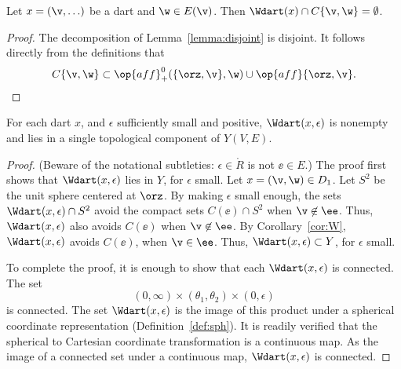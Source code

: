 \begin{corollary}\label{cor:W}
Let $x = (\v,\ldots)$ be a dart and $\w\in E(\v)$.
Then $\Wdart(x)\cap C\{\v,\w\}=\emptyset$.
\end{corollary}

\begin{proof} The decomposition of Lemma~\ref{lemma:disjoint} is
disjoint.  It follows directly from the definitions that
\begin{displaymath}C\{\v,\w\}\subset \op{aff}_+^0(\{\orz,\v\},\w) \cup 
\op{aff}\{\orz,\v\}.\end{displaymath}
\end{proof}

\begin{lemma}[] 
For each dart $x$, and $\epsilon$ sufficiently small and positive,
$\Wdart(x,\epsilon)$ is nonempty and lies in a single 
topological component of $Y(V,E)$.
\end{lemma}
%
%

\begin{proof} (Beware of the notational subtleties:
$\epsilon\in\ring{R}$ is not $\ee\in E$.)  The proof first shows
that $\Wdart(x,\epsilon)$ lies in $Y$, for $\epsilon$ small.  Let
$x=(\v,\w)\in D_1$.  Let $S^2$ be the unit sphere centered at
$\orz$.  By making $\epsilon$ small enough, the sets
$\Wdart(x,\epsilon)\cap S^2$ avoid the compact sets $C(\ee)\cap S^2$
when $\v\not\in \ee$.  Thus, $\Wdart(x,\epsilon)$ also avoids
$C(\ee)$ when $\v\not\in \ee$.  By Corollary~\ref{cor:W},
$\Wdart(x,\epsilon)$ avoids $C(\ee)$, when $\v\in \ee$.  Thus,
$\Wdart(x,\epsilon)\subset Y$, for $\epsilon$ small.

To complete the proof, it is enough to show that each
$\Wdart(x,\epsilon)$ is connected.  The set
\begin{displaymath}
(0,\infty) \times (\theta_1,\theta_2) \times (0,\epsilon)
\end{displaymath}
is connected.  The set $\Wdart(x,\epsilon)$ is the image of this
product under a spherical coordinate representation
(Definition~\ref{def:sph}).  %
It is readily verified that the spherical to Cartesian coordinate
transformation is a continuous map. As the image of a connected set
under a continuous map, $\Wdart(x,\epsilon)$ is connected.
\end{proof}
%
%

